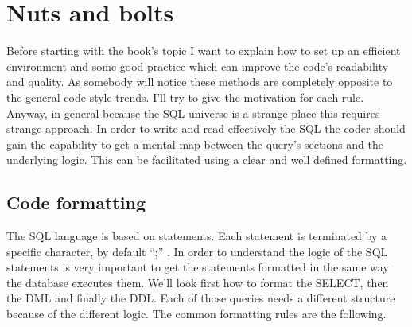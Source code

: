 \chapter{Nuts and bolts}
Before starting with the book's topic I want to explain how to set up an
efficient environment and some good practice which can improve the code's readability and quality.
As somebody will notice these methods are completely opposite to the general code style trends. I'll 
try to give the motivation for each rule. Anyway, in general because the SQL universe is a strange 
place this requires strange approach. In order to write and read effectively the SQL the coder should gain 
the capability to get a mental map  between the query's sections and the underlying logic. This can be 
facilitated using a clear and well defined formatting.\newline

\section{Code formatting}
The SQL language is based on statements. Each statement is terminated by a specific character, by default ``;'' . 
In order to understand the logic of the SQL statements is very important to get the statements formatted in the same 
way the database executes them. We'll look first how to format the SELECT, then the DML and finally the DDL. Each of 
those queries needs a different structure because of the different logic. The common formatting rules are the following.

